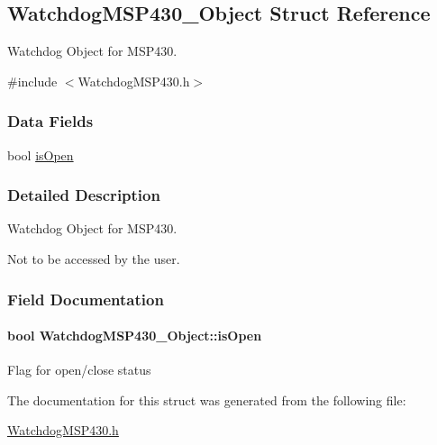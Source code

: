 \subsection{Watchdog\-M\-S\-P430\-\_\-\-Object Struct Reference}
\label{struct_watchdog_m_s_p430___object}


Watchdog Object for M\-S\-P430.  




{\ttfamily \#include $<$Watchdog\-M\-S\-P430.\-h$>$}

\subsubsection*{Data Fields}
\begin{DoxyCompactItemize}
\item 
bool \hyperlink{struct_watchdog_m_s_p430___object_abf8d36f3f4830d5bf9e1a69ed98c4a55}{is\-Open}
\end{DoxyCompactItemize}


\subsubsection{Detailed Description}
Watchdog Object for M\-S\-P430. 

Not to be accessed by the user. 

\subsubsection{Field Documentation}
\paragraph[{is\-Open}]{\setlength{\rightskip}{0pt plus 5cm}bool Watchdog\-M\-S\-P430\-\_\-\-Object\-::is\-Open}\label{struct_watchdog_m_s_p430___object_abf8d36f3f4830d5bf9e1a69ed98c4a55}
Flag for open/close status 

The documentation for this struct was generated from the following file\-:\begin{DoxyCompactItemize}
\item 
\hyperlink{_watchdog_m_s_p430_8h}{Watchdog\-M\-S\-P430.\-h}\end{DoxyCompactItemize}
